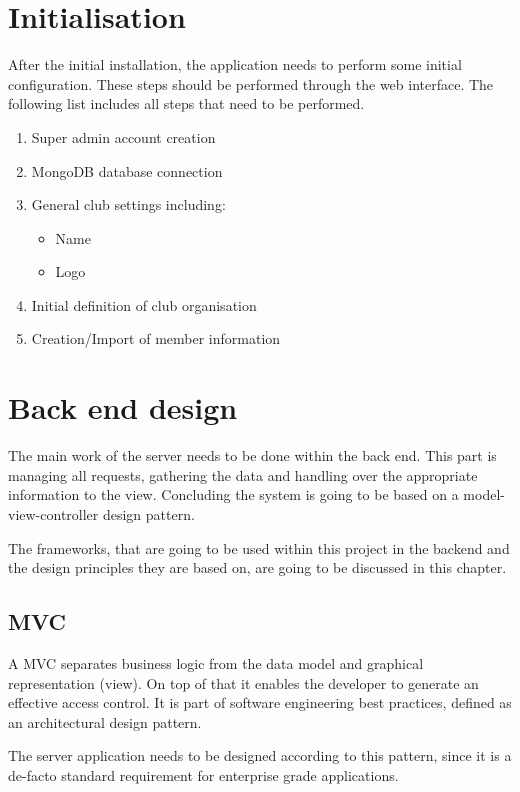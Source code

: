 \chapter{Initialisation}
After the initial installation, the application needs to perform some initial configuration. These steps should be performed through the web interface. The following list includes all steps that need to be performed.

\begin{enumerate}
    \item Super admin account creation
    \item MongoDB database connection
    \item General club settings including:
    \begin{itemize}
        \item Name
        \item Logo
    \end{itemize}
    \item Initial definition of club organisation
    \item Creation/Import of member information
\end{enumerate}

\chapter{Back end design}
The main work of the server needs to be done within the back end. This part is managing all requests, gathering the data and handling over the appropriate information to the view. Concluding the system is going to be based on a model-view-controller design pattern. 

The frameworks, that are going to be used within this project in the backend and the design principles they are based on, are going to be discussed in this chapter.

\section{\acrfull{MVC}}
A \acrshort{MVC} separates business logic from the data model and graphical representation (view). On top of that it enables the developer to generate an effective access control. It is part of software engineering best practices, defined as an architectural design pattern.

The server application needs to be designed according to this pattern, since it is a de-facto standard requirement for enterprise grade applications.

